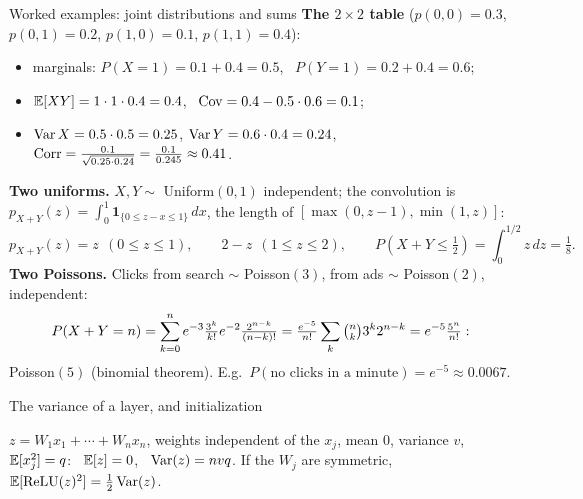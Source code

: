 \documentclass[aspectratio=1610,11pt]{beamer}
\begin{document}

\begin{frame}{Worked examples: joint distributions and sums}
    \small
    \textbf{The $2 \times 2$ table} ($p(0, 0) = 0.3$, $p(0, 1) = 0.2$, $p(1, 0) = 0.1$, $p(1, 1) = 0.4$):
    \begin{itemize}
        \item marginals: $P(X = 1) = 0.1 + 0.4 = 0.5$, \ $P(Y = 1) = 0.2 + 0.4 = 0.6$;
        \item $\mathbb{E}[XY] = 1 \cdot 1 \cdot 0.4 = 0.4$, \ $\operatorname{Cov} = 0.4 - 0.5 \cdot 0.6 = 0.1$;
        \item $\operatorname{Var} X = 0.5 \cdot 0.5 = 0.25$, $\operatorname{Var} Y = 0.6 \cdot 0.4 = 0.24$, \ $\operatorname{Corr} = \frac{0.1}{\sqrt{0.25 \cdot 0.24}} = \frac{0.1}{0.245} \approx 0.41$.
    \end{itemize}
    \textbf{Two uniforms.} $X, Y \sim$ Uniform$(0, 1)$ independent; the convolution is $p_{X+Y}(z) = \int_0^1\mathbf{1}_{\{0 \leq z - x \leq 1\}}\,dx$, the length of $[\max(0, z - 1), \min(1, z)]$:
    \[p_{X+Y}(z) = z \ \ (0 \leq z \leq 1), \qquad 2 - z \ \ (1 \leq z \leq 2), \qquad P(X + Y \leq \tfrac{1}{2}) = \int_0^{1/2}z\,dz = \tfrac{1}{8}.\]
    \textbf{Two Poissons.} Clicks from search $\sim$ Poisson$(3)$, from ads $\sim$ Poisson$(2)$, independent:
    \[P(X + Y = n) = \sum_{k=0}^ne^{-3}\tfrac{3^k}{k!}e^{-2}\tfrac{2^{n-k}}{(n - k)!} = \tfrac{e^{-5}}{n!}\sum_k\tbinom{n}{k}3^k2^{n-k} = e^{-5}\tfrac{5^n}{n!}:\]
    Poisson$(5)$ (binomial theorem). E.g.\ $P(\text{no clicks in a minute}) = e^{-5} \approx 0.0067$.
\end{frame}

\begin{frame}{The variance of a layer, and initialization}
    \begin{proposition}
        \small $z = W_1x_1 + \cdots + W_nx_n$, weights independent of the $x_j$, mean $0$, variance $v$, $\mathbb{E}[x_j^2] = q$: \ $\mathbb{E}[z] = 0$, \ $\operatorname{Var}(z) = nvq$. If the $W_j$ are symmetric, $\mathbb{E}[\operatorname{ReLU}(z)^2] = \frac{1}{2}\operatorname{Var}(z)$.
    \end{proposition}
\end{frame}
\end{document}
